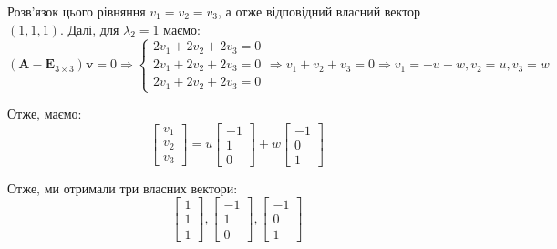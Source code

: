 \documentclass{hw_template}
\begin{document}
Розв'язок цього рівняння $v_1=v_2=v_3$, а отже відповідний власний вектор $(1,1,1)$. Далі, для $\lambda_2=1$ маємо:
\begin{equation*}
    (\boldsymbol{A}-\boldsymbol{E}_{3 \times 3})\boldsymbol{v} = 0 \Rightarrow \begin{cases}
        2v_1 + 2v_2 + 2v_3 = 0 \\
        2v_1 + 2v_2 + 2v_3 = 0 \\
        2v_1 + 2v_2 + 2v_3 = 0
    \end{cases} \Rightarrow v_1 + v_2 + v_3 = 0 \Rightarrow v_1 = -u-w, v_2 = u, v_3 = w
\end{equation*} 

Отже, маємо:
\begin{equation*}
    \begin{bmatrix}
        v_1 \\ v_2 \\ v_3
    \end{bmatrix} = u \begin{bmatrix}
        -1 \\ 1 \\ 0
    \end{bmatrix} + w \begin{bmatrix}
        -1 \\ 0 \\ 1
    \end{bmatrix}
\end{equation*}

Отже, ми отримали три власних вектори:
\begin{equation*}
    \begin{bmatrix}
        1 \\ 1 \\ 1
    \end{bmatrix}, \begin{bmatrix}
        -1 \\ 1 \\ 0
    \end{bmatrix}, \begin{bmatrix}
        -1 \\ 0 \\ 1
    \end{bmatrix}
\end{equation*}
\end{document}
